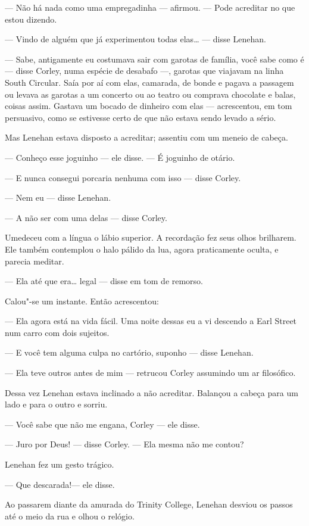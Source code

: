 --- Não há nada como uma empregadinha --- afirmou.  --- Pode acreditar no que
estou dizendo.

--- Vindo de alguém que já experimentou todas elas\ldots{} --- disse Lenehan.

--- Sabe, antigamente eu costumava sair com garotas de família, você sabe
como é --- disse Corley, numa espécie de desabafo ---, garotas que viajavam na
linha South Circular.  Saía por aí com elas, camarada, de bonde e pagava a
passagem ou levava as garotas a um concerto ou ao teatro ou comprava chocolate
e balas, coisas assim.  Gastava um bocado de dinheiro com elas --- acrescentou,
em tom persuasivo, como se estivesse certo de que não estava sendo levado a
sério.

Mas Lenehan estava disposto a acreditar; assentiu com um meneio de cabeça.

--- Conheço esse joguinho --- ele disse.  --- É joguinho de otário.

--- E nunca consegui porcaria nenhuma com isso --- disse Corley.

--- Nem eu --- disse Lenehan.

--- A não ser com uma delas --- disse Corley.

Umedeceu com a língua o lábio superior.  A recordação fez seus olhos brilharem.
Ele também contemplou o halo pálido da lua, agora praticamente oculta, e
parecia meditar.

--- Ela até que era\ldots{} legal --- disse em tom de remorso.

Calou"-se um instante.  Então acrescentou:

--- Ela agora está na vida fácil.  Uma noite dessas eu a vi descendo a Earl
Street num carro com dois sujeitos.

--- E você tem alguma culpa no cartório, suponho --- disse Lenehan.

--- Ela teve outros antes de mim --- retrucou Corley assumindo um ar
filosófico.

Dessa vez Lenehan estava inclinado a não acreditar.  Balançou a cabeça para um
lado e para o outro e sorriu.

--- Você sabe que não me engana, Corley --- ele disse.

--- Juro por Deus! --- disse Corley.  --- Ela mesma não me contou?

Lenehan fez um gesto trágico.

--- Que descarada!--- ele disse.

Ao passarem diante da amurada do Trinity College, Lenehan desviou os passos até
o meio da rua e olhou o relógio.

